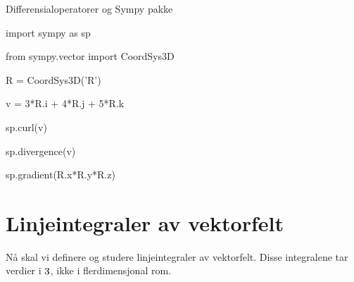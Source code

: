 \begin{oppsum}{Differensialoperatorer og Sympy pakke}
\begin{minipage}{.9\columnwidth}
\begin{lst}{}
import sympy as sp

from sympy.vector import CoordSys3D

R = CoordSys3D('R')

v = 3*R.i + 4*R.j + 5*R.k

sp.curl(v)

sp.divergence(v)

sp.gradient(R.x*R.y*R.z)
\end{lst}
\end{minipage}
\end{oppsum}
\section{Linjeintegraler av vektorfelt}\label{sect:linint2}

Nå skal vi definere og studere linjeintegraler av vektorfelt. 
Disse integralene tar verdier i $3$, ikke i flerdimensjonal rom.

